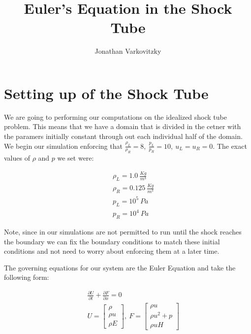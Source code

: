 \documentclass[a4paper,12pt,titlepage]{article}
\begin{document}
\title{Euler's Equation in the Shock Tube}
\author{Jonathan Varkovitzky}
\maketitle


\pagestyle{plain} %
\tableofcontents

\newpage

\setcounter{page}{2}





\newpage



\section{Setting up of the Shock Tube}

We are going to performing our computations on the idealized shock tube problem.  This means that we have a domain that is divided in the cetner with the paramers initially constant through out each individual half of the domain.  We begin our simulation enforcing that $\frac{\rho_L}{\rho_R} = 8,\ \frac{p_L}{p_R} = 10,\ u_L=u_R=0$.  The exact values of $\rho$ and $p$ we set were:

\begin{eqnarray}
&& \rho_L = 1.0\ \frac{Kg}{m^3} \nonumber \\ 
&& \rho_R = 0.125\ \frac{Kg}{m^3} \nonumber \\
&& p_L = 10^5\ Pa \nonumber \\
&& p_R = 10^4\ Pa \nonumber
\end{eqnarray}

Note, since in our simulations are not permitted to run until the shock reaches the boundary we can fix the boundary conditions to match these initial conditions and not need to worry about enforcing them at a later time.

The governing equations for our system are the Euler Equation and take the following form:

\begin{eqnarray}
&&\frac{\partial U}{\partial t} + \frac{\partial F}{\partial x} = 0\nonumber \\
&&U = \begin{bmatrix}\rho \\ \rho u \\ \rho E \end{bmatrix},\ F = \begin{bmatrix}\rho u\\ \rho u^2 + p\\ \rho u H \end{bmatrix}
\end{eqnarray}
\end{document}
